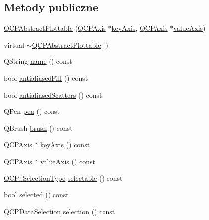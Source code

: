 \subsection*{Metody publiczne}
\begin{DoxyCompactItemize}
\item 
\hyperlink{class_q_c_p_abstract_plottable_af78a036e40db6f53a31abadc5323715a}{Q\+C\+P\+Abstract\+Plottable} (\hyperlink{class_q_c_p_axis}{Q\+C\+P\+Axis} $\ast$\hyperlink{class_q_c_p_abstract_plottable_a72c7a09c22963f2c943f07112b311103}{key\+Axis}, \hyperlink{class_q_c_p_axis}{Q\+C\+P\+Axis} $\ast$\hyperlink{class_q_c_p_abstract_plottable_a3106f9d34d330a6097a8ec5905e5b519}{value\+Axis})
\item 
virtual \hyperlink{class_q_c_p_abstract_plottable_a88112bcbe9eb995b1190ad7591f2d0b5}{$\sim$\+Q\+C\+P\+Abstract\+Plottable} ()
\item 
Q\+String \hyperlink{class_q_c_p_abstract_plottable_a1affc1972938e4364a9325e4e4e4dcea}{name} () const 
\item 
bool \hyperlink{class_q_c_p_abstract_plottable_a68d1c358db03faae376ec47c589abf27}{antialiased\+Fill} () const 
\item 
bool \hyperlink{class_q_c_p_abstract_plottable_aefc379bcc011660a5371ecc6088a97eb}{antialiased\+Scatters} () const 
\item 
Q\+Pen \hyperlink{class_q_c_p_abstract_plottable_a41d060007cc6b3037c9c04d22d0c0398}{pen} () const 
\item 
Q\+Brush \hyperlink{class_q_c_p_abstract_plottable_aa74cdceb9c7286ef116fbfa58e0326e7}{brush} () const 
\item 
\hyperlink{class_q_c_p_axis}{Q\+C\+P\+Axis} $\ast$ \hyperlink{class_q_c_p_abstract_plottable_a72c7a09c22963f2c943f07112b311103}{key\+Axis} () const 
\item 
\hyperlink{class_q_c_p_axis}{Q\+C\+P\+Axis} $\ast$ \hyperlink{class_q_c_p_abstract_plottable_a3106f9d34d330a6097a8ec5905e5b519}{value\+Axis} () const 
\item 
\hyperlink{namespace_q_c_p_ac6cb9db26a564b27feda362a438db038}{Q\+C\+P\+::\+Selection\+Type} \hyperlink{class_q_c_p_abstract_plottable_a9369b0da736b88dea0ee6b7345f8ea74}{selectable} () const 
\item 
bool \hyperlink{class_q_c_p_abstract_plottable_ab901903adcb0e29467d63de72340ab29}{selected} () const 
\item 
\hyperlink{class_q_c_p_data_selection}{Q\+C\+P\+Data\+Selection} \hyperlink{class_q_c_p_abstract_plottable_a6fcea502826afbaab2568bd3ebc61b4b}{selection} () const 

\end{DoxyCompactItemize}
